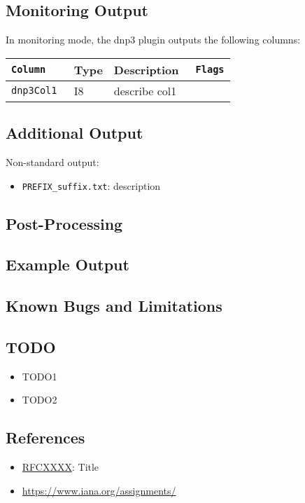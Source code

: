 \documentclass[documentation]{subfiles}
\begin{document}
\subsection{Monitoring Output}
In monitoring mode, the dnp3 plugin outputs the following columns:
\begin{longtable}{>{\tt}lll>{\tt\small}l}
    \toprule
    {\bf Column} & {\bf Type} & {\bf Description} & {\bf Flags}\\
    \midrule\endhead%
    dnp3Col1 & I8 & describe col1 & \\
    \bottomrule
\end{longtable}

\subsection{Additional Output}
Non-standard output:
\begin{itemize}
    \item {\tt PREFIX\_suffix.txt}: description
\end{itemize}

\subsection{Post-Processing}

\subsection{Example Output}

\subsection{Known Bugs and Limitations}

\subsection{TODO}
\begin{itemize}
    \item TODO1
    \item TODO2
\end{itemize}

\subsection{References}
\begin{itemize}
    \item \href{https://tools.ietf.org/html/rfcXXXX}{RFCXXXX}: Title
    \item \url{https://www.iana.org/assignments/}
\end{itemize}
\end{document}
